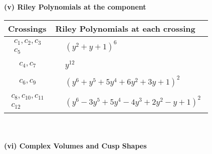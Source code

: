 \documentclass[1p]{elsarticle_modified}
\theoremstyle{definition}
\begin{document}
\newpage\renewcommand{\arraystretch}{1}
\flushleft \textbf{(v) Riley Polynomials at the component}\newline \\
\begin{tabular}{m{50pt}|m{274pt}}
Crossings & \hspace{64pt}Riley Polynomials at each crossing \\
\hline $$\begin{aligned}c_{1},c_{2},c_{3}\\c_{5}\end{aligned}$$&$\begin{aligned}
&(y^2+y+1)^6
\end{aligned}$\\
\hline $$\begin{aligned}c_{4},c_{7}\end{aligned}$$&$\begin{aligned}
&y^{12}
\end{aligned}$\\
\hline $$\begin{aligned}c_{6},c_{9}\end{aligned}$$&$\begin{aligned}
&(y^6+y^5+5 y^4+6 y^2+3 y+1)^2
\end{aligned}$\\
\hline $$\begin{aligned}c_{8},c_{10},c_{11}\\c_{12}\end{aligned}$$&$\begin{aligned}
&(y^6-3 y^5+5 y^4-4 y^3+2 y^2- y+1)^2
\end{aligned}$\\
\hline
\end{tabular}\\~\\
\newpage\flushleft \textbf{(vi) Complex Volumes and Cusp Shapes}
\end{document}
